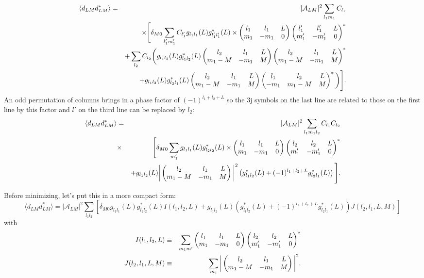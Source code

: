 \documentclass[prl,amsmath,amssymb,floatfix,superscriptaddress,nofootinbib,twocolumn]{revtex4-1}
\def\be{\begin{equation}}
\def\ee{\end{equation}}
\def\bea{\begin{eqnarray}}
\def\eea{\end{eqnarray}}
\newcommand{\vs}{\nonumber\\}
\begin{document}
  \bea
 \langle d_{LM} d^*_{LM} \rangle &=& \vert \mathcal{A}_{LM}\vert^2
 \sum_{l_1m_1} C_{l_1}
 \vs
 &&\times 
\Bigg[ \delta_{M0}\sum_{ l_1'm_1'}  C_{l_1'} g_{l_1l_1}(L)  g^*_{l_1'l_1'}(L) 
\times \left(\begin{matrix} l_1 & l_1 &L\cr m_1&-m_1&0\end{matrix}\right)
 \left(\begin{matrix} l_1' & l_1' &L\cr m_1'&-m_1'&0\end{matrix}\right)^*\vs
 &&+ \sum_{l_2}  C_{l_2}  \bigg( g_{l_1l_2}(L)  g^*_{l_1l_2}(L)  \left(\begin{matrix} l_2 & l_1 &L\cr m_1-M&-m_1&M\end{matrix}\right)
 \left(\begin{matrix} l_2 & l_1 &L\cr m_1-M&-m_1&M\end{matrix}\right)^* 
 \vs
 &&+ g_{l_1l_2}(L)  g^*_{l_2l_1}(L)  \left(\begin{matrix} l_2 & l_1 &L\cr m_1-M&-m_1&M\end{matrix}\right)
 \left(\begin{matrix} l_1 & l_2 &L\cr -m_1&m_1-M&M\end{matrix}\right)^* 
\bigg) \Bigg].
  \eea 
An odd permutation of columns brings in a phase factor of $(-1)^{l_1+l_2+L}$ so the 3j symbols on the last line are related to those on the first line by this factor and $l'$ on the third line can be replaced by $l_2$:
 \bea
 \langle d_{LM} d^*_{LM} \rangle &=& \vert \mathcal{A}_{LM}\vert^2
 \sum_{l_1m_1l_2} C_{l_1} C_{l_2}  
 \vs
 &\times &
\Bigg[ \delta_{M0}\sum_{ m_1'}  g_{l_1l_1}(L)  g^*_{l_2l_2}(L) 
\times \left(\begin{matrix} l_1 & l_1 &L\cr m_1&-m_1&0\end{matrix}\right)
 \left(\begin{matrix} l_2& l_2 &L\cr m_1'&-m_1'&0\end{matrix}\right)^*\vs
 &&+ g_{l_1l_2}(L)  \bigg\vert\left(\begin{matrix} l_2 & l_1 &L\cr m_1-M&-m_1&M\end{matrix}\right)\bigg\vert^2
  \left( g^*_{l_1l_2}(L)  + (-1)^{l_1+l_2+L}g^*_{l_2l_1}(L) \right)
  \Bigg].
  \eea 

Before minimizing, let's put this in a more compact form:
\be  
  \langle d_{LM} d^*_{LM} \rangle 
  = \vert \mathcal{A}_{LM}\vert^2 \sum_{l_1l_2}
  \left[ \delta_{M0} g_{l_1l_1}(L)  g^*_{l_2l_2}(L) I(l_1,l_2,L)
  + g_{l_1l_2}(L)   \left( g^*_{l_1l_2}(L)  + (-1)^{l_1+l_2+L}g^*_{l_2l_1}(L) \right) J(l_2,l_1,L,M)
  \right]
 \ee 
 with
 \bea
 I(l_1,l_2,L) &\equiv& \sum_{m_1m'} \left(\begin{matrix} l_1 & l_1 &L\cr m_1&-m_1&0\end{matrix}\right)
 \left(\begin{matrix} l_2& l_2 &L\cr m_1'&-m_1'&0\end{matrix}\right)^*
 \vs
 J(l_2,l_1,L,M) &\equiv&\sum_{m_1} \bigg\vert\left(\begin{matrix} l_2 & l_1 &L\cr m_1-M&-m_1&M\end{matrix}\right)\bigg\vert^2
 .\eea
 

\end{document}
